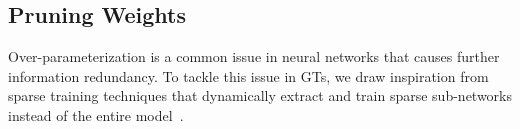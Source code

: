 \documentclass[letterpaper]{article} %
\begin{document}
\subsection{Pruning Weights}
\label{sec:pruning-weight}

Over-parameterization is a common issue in neural networks that causes further information redundancy. To tackle this issue in GTs, we draw inspiration from sparse training techniques that dynamically extract and train sparse sub-networks instead of the entire model~\cite{survey-pruning}. 

\end{document}
